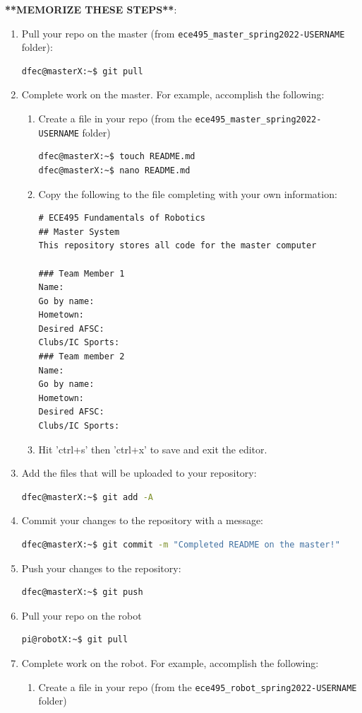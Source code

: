 \documentclass{handout}
\begin{document}
\textbf{**MEMORIZE THESE STEPS**}:
\begin{enumerate}
	\item Pull your repo on the master (from \texttt{ece495\_master\_spring2022-USERNAME} folder):
\begin{lstlisting}[language=bash]
dfec@masterX:~$ git pull
\end{lstlisting}
	\item Complete work on the master. For example, accomplish the following:
	\begin{enumerate}
		\item Create a file in your repo (from the \texttt{ece495\_master\_spring2022-USERNAME} folder)

\begin{lstlisting}[language=bash]
dfec@masterX:~$ touch README.md
dfec@masterX:~$ nano README.md	
\end{lstlisting}

\item Copy the following to the file completing with your own information:
\begin{lstlisting}
# ECE495 Fundamentals of Robotics
## Master System
This repository stores all code for the master computer

### Team Member 1
Name:
Go by name:
Hometown:
Desired AFSC:
Clubs/IC Sports:
### Team member 2
Name:
Go by name:
Hometown:
Desired AFSC:
Clubs/IC Sports:
\end{lstlisting}
\item Hit 'ctrl+s' then 'ctrl+x' to save and exit the editor.
	\end{enumerate}
	\item Add the files that will be uploaded to your repository:
\begin{lstlisting}[language=bash]
dfec@masterX:~$ git add -A
\end{lstlisting}
	\item Commit your changes to the repository with a message:
\begin{lstlisting}[language=bash]
dfec@masterX:~$ git commit -m "Completed README on the master!"
\end{lstlisting}
	\item Push your changes to the repository:
\begin{lstlisting}[language=bash]
dfec@masterX:~$ git push
\end{lstlisting}
	\item Pull your repo on the robot
\begin{lstlisting}[language=bash]
pi@robotX:~$ git pull
\end{lstlisting}
		\item Complete work on the robot. For example, accomplish the following:
	\begin{enumerate}
		\item Create a file in your repo (from the \texttt{ece495\_robot\_spring2022-USERNAME} folder)
		

\end{enumerate}
\end{enumerate}
\end{document}
